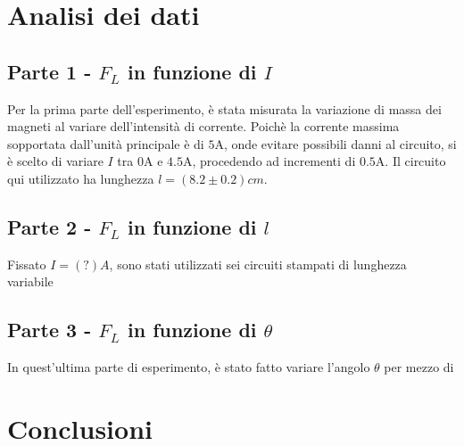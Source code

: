 \documentclass[11pt, a4paper]{article}
\numberwithin{equation}{section} %
\begin{document}
    \section{Analisi dei dati}
    
    \subsection{Parte 1 - $F_{L}$ in funzione di $I$}

    Per la prima parte dell'esperimento, è stata misurata la variazione di massa dei magneti al variare dell'intensità di corrente. Poichè la corrente massima sopportata dall'unità principale è di $5\text{A}$, onde evitare possibili danni al circuito, si è scelto di variare $I$ tra $0\text{A}$ e $4.5\text{A}$, procedendo ad incrementi di $0.5\text{A}$. Il circuito qui utilizzato ha lunghezza $l = (8.2 \pm 0.2)cm$.



    \subsection{Parte 2 - $F_{L}$ in funzione di $l$}

    Fissato $I = (?)A$, sono stati utilizzati sei circuiti stampati di lunghezza variabile %



    \subsection{Parte 3 - $F_{L}$ in funzione di $\theta$}

    In quest'ultima parte di esperimento, è stato fatto variare l'angolo $\theta$ per mezzo di %



    \section{Conclusioni}
\end{document}
